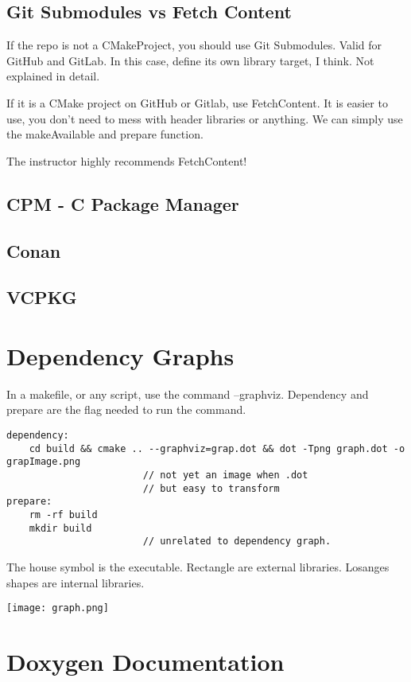 \subsection{Git Submodules vs Fetch Content}

If the repo is not a CMakeProject, you should use Git Submodules. Valid for GitHub and GitLab. In this case, 
define its own library target, I think. Not explained in detail.

If it is a CMake project on GitHub or Gitlab, use FetchContent. It is easier to use, you don't need to mess with header
libraries or anything. We can simply use the makeAvailable and prepare function.

The instructor highly recommends FetchContent!

\subsection{CPM - C Package Manager}
\subsection{Conan}
\subsection{VCPKG}


\section{Dependency Graphs}

In a makefile, or any script, use the command --graphviz. Dependency and prepare are the flag needed to run the command.

\begin{verbatim}
dependency:
    cd build && cmake .. --graphviz=grap.dot && dot -Tpng graph.dot -o grapImage.png
                        // not yet an image when .dot
                        // but easy to transform
prepare:
    rm -rf build
    mkdir build
                        // unrelated to dependency graph.
\end{verbatim}

The house symbol is the executable. Rectangle are external libraries. Losanges shapes are internal libraries.

\begin{center}
    \texttt{[image: graph.png]}
\end{center}

\section{Doxygen Documentation}

